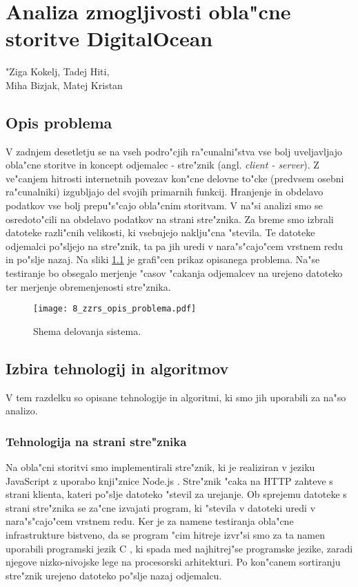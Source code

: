 \chapter[Analiza zmogljivosti obla"cne storitve DigitalOcean]{Analiza zmogljivosti obla"cne storitve DigitalOcean}

\pagestyle{fancy}
\fancyhf{}
\fancyhead[LE,RO]{\thepage}
\fancyhead[RE,LO]{\leftmark}
\lstset{language=C}

\huge "Ziga Kokelj, Tadej Hiti,\\Miha Bizjak, Matej Kristan
\normalsize
\bigskip

\section{Opis problema} \label{8_opis_problema}
\noindent V zadnjem desetletju se na vseh podro"cjih ra"cunalni"stva vse bolj uveljavljajo obla"cne storitve in koncept odjemalec - stre"znik (angl. \textit{client - server}). Z ve"canjem hitrosti internetnih povezav kon"cne delovne to"cke (predvsem osebni ra"cunalniki) izgubljajo del svojih primarnih funkcij. Hranjenje in obdelavo podatkov vse bolj prepu"s"cajo obla"cnim storitvam. V na"si analizi smo se osredoto"cili na obdelavo podatkov na strani stre"znika. Za breme smo izbrali datoteke razli"cnih velikosti, ki vsebujejo naklju"cna "stevila. Te datoteke odjemalci po"sljejo na stre"znik, ta pa jih uredi v nara"s"cajo"cem vrstnem redu in po"slje nazaj. Na sliki \ref{8_opis_problema} je grafi"cen prikaz opisanega problema. Na"se testiranje bo obsegalo merjenje  "casov "cakanja  odjemalcev na urejeno datoteko ter merjenje obremenjenosti stre"znika.

\begin{figure}
  \centering
    \texttt{[image: 8\_zzrs\_opis\_problema.pdf]}
  \caption{Shema delovanja sistema.}
  \label{8_opis_problema}
\end{figure}


\section{Izbira tehnologij in algoritmov}
V tem razdelku so opisane tehnologije in algoritmi, ki smo jih uporabili za na"so analizo.


\subsection{Tehnologija na strani stre"znika }
Na obla"cni storitvi smo implementirali stre"znik, ki je realiziran v jeziku JavaScript \cite{8_js} z uporabo knji"znice Node.js \cite{8_node}. Stre"znik "caka na HTTP zahteve s strani klienta, kateri po"slje datoteko "stevil za urejanje. Ob sprejemu datoteke s strani stre"znika se za"cne izvajati program, ki "stevila v datoteki uredi v nara"s"cajo"cem vrstnem redu. Ker je za namene testiranja obla"cne infrastrukture bistveno, da se program "cim hitreje izvr"si smo za ta namen uporabili programski jezik C \cite{8_c}, ki spada med najhitrej"se programske jezike, zaradi njegove nizko-nivojske lege na procesorski arhitekturi. Po kon"canem sortiranju stre"znik urejeno datoteko po"slje nazaj odjemalcu.

